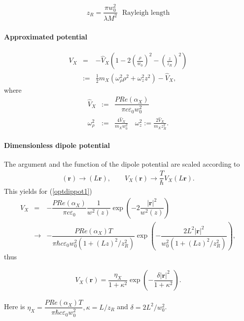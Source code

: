 \documentclass[12pt]{article}
\begin{document}
\begin{align}
z_R = \dfrac{\pi w_0^2}{\lambda M^2} \,\,\text{ Rayleigh length} 
\end{align}
\paragraph{Approximated potential}
\begin{eqnarray}
V_X &=& -\hat{V}_X\left(1-2\left(\frac{\rho}{w_0}\right)^2-\left(\frac{z}{z_R}\right)^2\right)\\
&:=& \frac{1}{2}m_X\left(\omega_{\rho}^2 \rho^2+\omega_z^2 z^2\right)-\hat{V}_X \label{optdippot2},
\end{eqnarray}
where 
\begin{eqnarray}
\hat{V}_X&:=&\dfrac{P Re(\alpha_X)}{\pi c \varepsilon_0 w_0^2}\\
\omega_{\rho}^2&:=&\frac{4\hat{V}_X}{m_X w_0^2} \quad \omega_z^2:= \frac{2\hat{V}_X}{m_X z_R^2} .
\end{eqnarray}
\paragraph{Dimensionless dipole potential}
The argument and the function of the dipole potential are scaled according to
\begin{align}
(\mathbf{r}) \rightarrow (L\mathbf{r}), \qquad V_X(\mathbf{r}) \rightarrow \dfrac{T}{\hbar} V_X(L\mathbf{r}).
\end{align}
This yields for (\ref{optdippot1})
\begin{eqnarray}
 V_X &=& - \dfrac{P Re(\alpha_X)}{\pi c \varepsilon_0} \dfrac{1}{w^2(z)} \exp\left( -2\dfrac{|\mathbf{r}|^2}{w^2(z)} \right) \\
 &\rightarrow& - \dfrac{P Re(\alpha_X) T}{\pi \hbar c \varepsilon_0 w_0^2\left(1+(Lz)^2/z^2_R\right)}\exp\left( -\dfrac{2L^2|\mathbf{r}|^2}{w_0^2\left(1+(Lz)^2/z^2_R\right)} \right),
\end{eqnarray}
thus
\begin{center}
\begin{tcolorbox}
\begin{eqnarray}
 V_X(\mathbf{r})=\dfrac{\eta_X}{1+\kappa^2} \exp{\left(-\dfrac{\delta |\mathbf{r}|^2}{1+\kappa^2}\right)}. 
\end{eqnarray}
\end{tcolorbox}
\end{center}
Here is $\eta_X =  \dfrac{P Re(\alpha_X) T}{\pi\hbar c \varepsilon_0 w_0^2}, \kappa = L / z_R $ and $\delta = 2 L^2 / w_0^2$.
\end{document}
